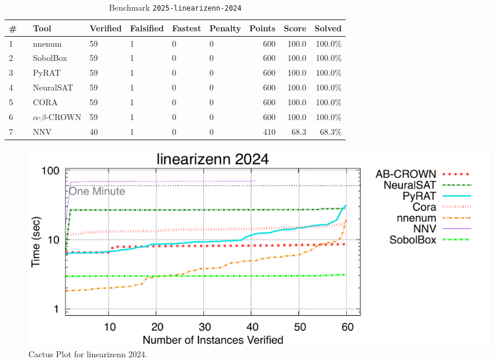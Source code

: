 \begin{table}[h]
\begin{center}
\caption{Benchmark \texttt{2025-linearizenn-2024}} \label{tab:cat_2025_linearizenn_2024}
{\setlength{\tabcolsep}{2pt}
\begin{tabular}[h]{@{}llllllrrr@{}}
\toprule
\textbf{\# ~} & \textbf{Tool} & \textbf{Verified} & \textbf{Falsified} & \textbf{Fastest} & \textbf{Penalty} & \textbf{Points} & \textbf{Score} & \textbf{Solved}\\
\midrule
1 & nnenum & 59 & 1 & 0 & 0 & 600 & 100.0 & 100.0\% \\
2 & SobolBox & 59 & 1 & 0 & 0 & 600 & 100.0 & 100.0\% \\
3 & PyRAT & 59 & 1 & 0 & 0 & 600 & 100.0 & 100.0\% \\
4 & NeuralSAT & 59 & 1 & 0 & 0 & 600 & 100.0 & 100.0\% \\
5 & CORA & 59 & 1 & 0 & 0 & 600 & 100.0 & 100.0\% \\
6 & $\alpha$-$\beta$-CROWN & 59 & 1 & 0 & 0 & 600 & 100.0 & 100.0\% \\
7 & NNV & 40 & 1 & 0 & 0 & 410 & 68.3 & 68.3\% \\
\bottomrule
\end{tabular}
}
\end{center}
\end{table}



\begin{figure}[h]
\centerline{\includegraphics[width=\textwidth]{cactus/2025_linearizenn_2024.pdf}}
\caption{Cactus Plot for linearizenn 2024.}
\label{fig:quantPic}
\end{figure}


\clearpage

